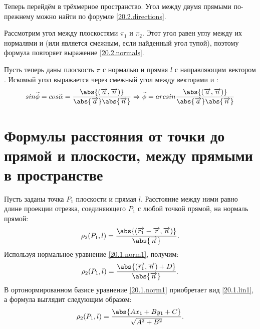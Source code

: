   Теперь перейдём в трёхмерное пространство. Угол между двумя прямыми по-прежнему можно найти по форумле \ref{20.2.directions}. 
  
  Рассмотрим угол между плоскостями $\pi_1$ и $\pi_2$. Этот угол равен углу между их нормалями  и  (или является смежным, если найденный угол тупой), поэтому формула повторяет выражение \ref{20.2.normals}.
  
  Пусть теперь даны плоскость $\pi$ с нормалью  и прямая $l$ с направляющим вектором . Искомый угол выражается через смежный угол между векторами  и :
  \begin{equation}
  sin  \widetilde \phi = cos  \widetilde \alpha = \dfrac{\abs{(\overrightarrow{a},\overrightarrow{n})}}{\abs{\overrightarrow{a}} \abs{\overrightarrow{n}}} \Rightarrow
  \widetilde \phi = arcsin \dfrac{\abs{(\overrightarrow{a},\overrightarrow{n})}}{\abs{\overrightarrow{a}} \abs{\overrightarrow{n}}}
  \end{equation}



\section{Формулы расстояния от точки до прямой и плоскости, между прямыми в пространстве}
  Пусть заданы точка $P_1$ плоскости и прямая $l$. Расстояние между ними равно длине проекции отрезка, соединяющего $P_1$ с любой точкой прямой, на нормаль прямой:
  \begin{equation}\label{20.3.normals1}
  \rho_2 (P_1,l) = \dfrac{ \abs{(\overrightarrow{r_1}-\overrightarrow{r},\overrightarrow{n})} }{ \abs{\overrightarrow{n}} }.
  \end{equation}   
  Используя нормальное уравнение \ref{20.1.norm1}, получим:
  \begin{equation}\label{20.3.normals2}
  \rho_2 (P_1,l) = \dfrac{\abs{(\overrightarrow{r_1},\overrightarrow{n})+D}}{\abs{\overrightarrow{n}}}.
  \end{equation}
  В ортонормированном базисе уравнение \ref{20.1.norm1} приобретает вид \ref{20.1.lin1}, а формула выглядит следующим образом:
  \begin{equation}
  \rho_2 (P_1,l) = \dfrac{\abs{Ax_1+By_1+C}}{\sqrt{A^2+B^2}}.
  \end{equation}
  
